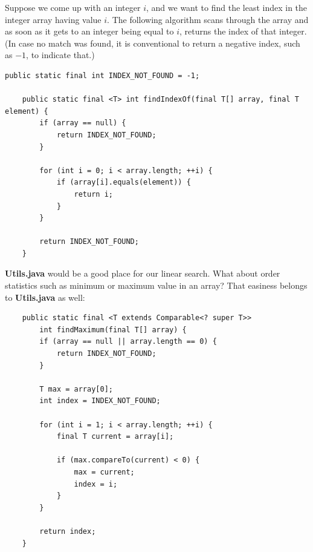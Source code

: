 \documentclass[oneside]{book}
\begin{document}
Suppose we come up with an integer $i$, and we want to find the least index in the integer array having value $i$. The following algorithm scans through the array and as soon as it gets to an integer being equal to $i$, returns the index of that integer. (In case no match was found, it is conventional to return a negative index, such as $-1$, to indicate that.)
\begin{lstlisting}[caption={Linear search algorithm}]
    public static final int INDEX_NOT_FOUND = -1;
    
    public static final <T> int findIndexOf(final T[] array, final T element) {
        if (array == null) {
            return INDEX_NOT_FOUND;
        }
        
        for (int i = 0; i < array.length; ++i) {
            if (array[i].equals(element)) {
                return i;
            }
        }
        
        return INDEX_NOT_FOUND;
    }
\end{lstlisting}
\textbf{Utils.java} would be a good place for our linear search. What about order statistics such as minimum or maximum value in an array? That easiness belongs to \textbf{Utils.java} as well:
\begin{lstlisting}
    public static final <T extends Comparable<? super T>> 
        int findMaximum(final T[] array) {
        if (array == null || array.length == 0) {
            return INDEX_NOT_FOUND;
        }
        
        T max = array[0];
        int index = INDEX_NOT_FOUND;
        
        for (int i = 1; i < array.length; ++i) {
            final T current = array[i];
            
            if (max.compareTo(current) < 0) {
                max = current;
                index = i;
            }
        }
        
        return index;
    }
\end{lstlisting}
\end{document}
